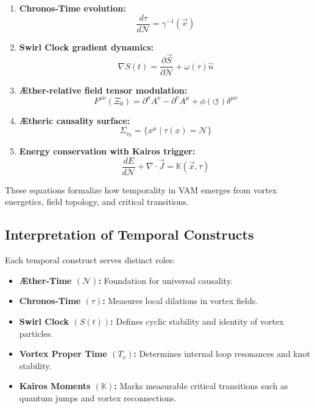 \documentclass[preprint]{revtex4-2}
\begin{document}
\begin{enumerate}
    \item \textbf{Chronos-Time evolution:}
    \begin{equation}
        \frac{d\tau}{d\mathcal{N}} = \gamma^{-1}(\vec{v})
    \label{eq:chronos_time}
    \end{equation}

    \item \textbf{Swirl Clock gradient dynamics:}
    \begin{equation}
        \nabla S(t) = \frac{\partial \vec{S}}{\partial \mathcal{N}} + \omega(\tau)\hat{n}
    \label{eq:swirl_clock}
    \end{equation}

    \item \textbf{Æther-relative field tensor modulation:}
    \begin{equation}
        F^{\mu\nu}(\Xi_0) = \partial^\mu A^\nu - \partial^\nu A^\mu + \phi(\circlearrowleft)\delta^{\mu\nu}
    \label{eq:Æther-field_tensor}
    \end{equation}

    \item \textbf{Ætheric causality surface:}
    \begin{equation}
        \Sigma_{\nu_0} = \{ x^\mu \mid \tau(x) = \mathcal{N} \}
    \label{eq:Æther-causality}
    \end{equation}

    \item \textbf{Energy conservation with Kairos trigger:}
    \begin{equation}
        \frac{dE}{d\mathcal{N}} + \nabla \cdot \vec{J} = \mathbb{K}(\vec{x}, \tau)
    \label{eq:Kairos_energy}
    \end{equation}
\end{enumerate}

These equations formalize how temporality in VAM emerges from vortex energetics, field topology, and critical transitions.

\subsection{Interpretation of Temporal Constructs}

Each temporal construct serves distinct roles:
\begin{itemize}
    \item \textbf{Æther-Time $(\mathcal{N})$:} Foundation for universal causality.
    \item \textbf{Chronos-Time $(\tau)$:} Measures local dilations in vortex fields.
    \item \textbf{Swirl Clock $(S(t))$:} Defines cyclic stability and identity of vortex particles.
    \item \textbf{Vortex Proper Time $(T_v)$:} Determines internal loop resonances and knot stability.
    \item \textbf{Kairos Moments $(\mathbb{K})$:} Marks measurable critical transitions such as quantum jumps and vortex reconnections.
\end{itemize}
\end{document}
